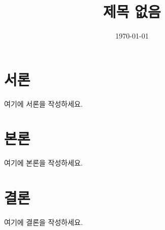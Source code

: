 \documentclass{report}
\title{제목 없음}
\author{}
\date{\today}
\begin{document}
\maketitle

\chapter{서론}
여기에 서론을 작성하세요.

\chapter{본론}
여기에 본론을 작성하세요.

\chapter{결론}
여기에 결론을 작성하세요.
\end{document}
